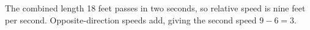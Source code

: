 The combined length 18 feet passes in two seconds, so relative speed is nine feet per second. Opposite-direction speeds add, giving the second speed $9-6=\boxed3$.
